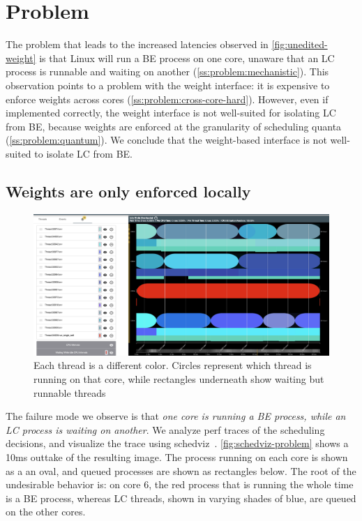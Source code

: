\section{Problem}\label{s:problem}

The problem that leads to the increased latencies observed in
\autoref{fig:unedited-weight} is that Linux will run a BE process on one core,
unaware that an LC process is runnable and waiting on another
(\autoref{ss:problem:mechanistic}). This observation points to a problem with
the \cgroups{} weight interface: it is expensive to enforce weights across cores
(\autoref{ss:problem:cross-core-hard}). However, even if implemented correctly,
the \cgroups{} weight interface is not well-suited for isolating LC from BE,
because weights are enforced at the granularity of scheduling quanta
(\autoref{ss:problem:quantum}). We conclude that the weight-based interface is
not well-suited to isolate LC from BE.

\subsection{Weights are only enforced locally}\label{ss:problem:mechanistic}

\begin{figure}[t]
    \centering
    \includegraphics[width=\columnwidth]{graphs/schedviz-problem.png}
    \caption{Each thread is a different color. Circles represent which
    thread is running on that core, while rectangles underneath show waiting but
    runnable threads
    }\label{fig:schedviz-problem}
\end{figure}

The failure mode we observe is that \textit{one core is running a BE process,
while an LC process is waiting on another}. We analyze perf traces of the
scheduling decisions, and visualize the trace using schedviz~\cite{TODO}.
\autoref{fig:schedviz-problem} shows a 10ms outtake of the resulting image. The
process running on each core is shown as a an oval, and queued processes are
shown as rectangles below. The root of the undesirable behavior is: on core 6,
the red process that is running the whole time is a BE process, whereas LC
threads, shown in varying shades of blue, are queued on the other cores.

